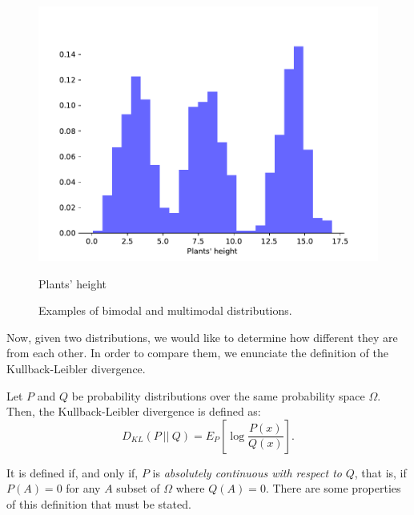 \begin{nexample}
\begin{figure}[H]
      \includegraphics[width=\linewidth]{media/multimodal.pdf}
      \caption{Plants' height}\label{fig:RFCM}
    \endminipage
    \caption{Examples of bimodal and multimodal distributions.}
    \end{figure}
\end{nexample}


Now, given two distributions, we would like to determine how different they are from each other.
In order to compare them, we enunciate the definition of the Kullback-Leibler divergence.

\begin{ndef}
Let $P$ and $Q$ be probability distributions over the same probability space $\Omega$. Then, the Kullback-Leibler divergence is defined as:
$$
D_{KL}(P \ || \ Q) = E_P\left[\log{\frac{P(x)}{Q(x)}}\right].
$$
\end{ndef}
It is defined if, and only if, $P$ is \emph{absolutely continuous with respect to} $Q$, that is, if $P(A) = 0$ for any $A$ subset of $\Omega$ where $Q(A) = 0$.
 There are some properties of this definition that must be stated. 

